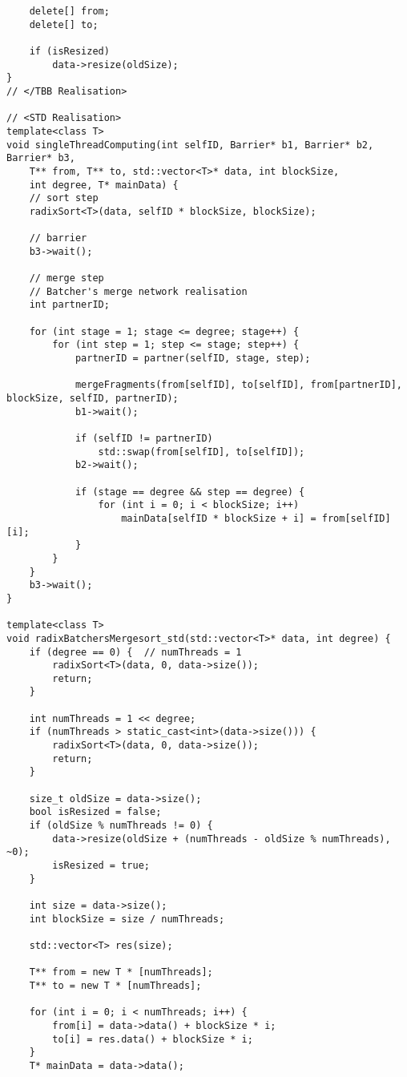 \documentclass{report}
\begin{document}
\begin{lstlisting}
    delete[] from;
    delete[] to;

    if (isResized)
        data->resize(oldSize);
}
// </TBB Realisation>

// <STD Realisation>
template<class T>
void singleThreadComputing(int selfID, Barrier* b1, Barrier* b2, Barrier* b3,
    T** from, T** to, std::vector<T>* data, int blockSize,
    int degree, T* mainData) {
    // sort step
    radixSort<T>(data, selfID * blockSize, blockSize);

    // barrier
    b3->wait();

    // merge step
    // Batcher's merge network realisation
    int partnerID;

    for (int stage = 1; stage <= degree; stage++) {
        for (int step = 1; step <= stage; step++) {
            partnerID = partner(selfID, stage, step);

            mergeFragments(from[selfID], to[selfID], from[partnerID], blockSize, selfID, partnerID);
            b1->wait();

            if (selfID != partnerID)
                std::swap(from[selfID], to[selfID]);
            b2->wait();

            if (stage == degree && step == degree) {
                for (int i = 0; i < blockSize; i++)
                    mainData[selfID * blockSize + i] = from[selfID][i];
            }
        }
    }
    b3->wait();
}

template<class T>
void radixBatchersMergesort_std(std::vector<T>* data, int degree) {
    if (degree == 0) {  // numThreads = 1
        radixSort<T>(data, 0, data->size());
        return;
    }

    int numThreads = 1 << degree;
    if (numThreads > static_cast<int>(data->size())) {
        radixSort<T>(data, 0, data->size());
        return;
    }

    size_t oldSize = data->size();
    bool isResized = false;
    if (oldSize % numThreads != 0) {
        data->resize(oldSize + (numThreads - oldSize % numThreads), ~0);
        isResized = true;
    }

    int size = data->size();
    int blockSize = size / numThreads;

    std::vector<T> res(size);

    T** from = new T * [numThreads];
    T** to = new T * [numThreads];

    for (int i = 0; i < numThreads; i++) {
        from[i] = data->data() + blockSize * i;
        to[i] = res.data() + blockSize * i;
    }
    T* mainData = data->data();


\end{lstlisting}
\end{document}
